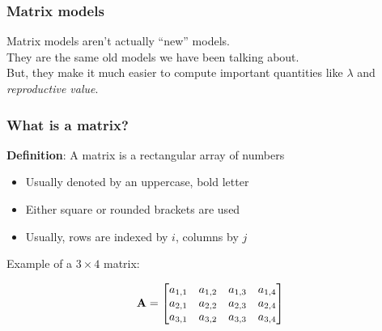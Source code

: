 \documentclass[color=usenames,dvipsnames]{beamer}\usepackage[]{graphicx}\usepackage[]{color}
\begin{document}
\begin{frame}
  \frametitle{Matrix models}
  \Large
  Matrix models aren't actually ``new'' models. \\
  \pause
  \vfill
  They are the same old models we have been talking about. \\
  \pause
  \vfill
  But, they make it much easier to compute important
  quantities like $\lambda$ and {\it reproductive value}. \\
\end{frame}



\begin{frame}
  \frametitle{What is a matrix?}
  {\bf Definition}: A matrix is a rectangular array of numbers
  \begin{itemize}
    \item Usually denoted by an uppercase, bold letter
    \item Either square or rounded brackets are used
    \item Usually, rows are indexed by $i$, columns by $j$
  \end{itemize}
  \pause

  \vspace{1cm}
  Example of a $3 \times 4$ matrix: \par
  \begin{center}
    \Large
    \[
    { \bf A} =
    \begin{bmatrix}
      a_{1,1} & a_{1,2} & a_{1,3} & a_{1,4} \\
      a_{2,1} & a_{2,2} & a_{2,3} & a_{2,4} \\
      a_{3,1} & a_{3,2} & a_{3,3} & a_{3,4}
    \end{bmatrix}
    \]
  \end{center}
\end{frame}
\end{document}
